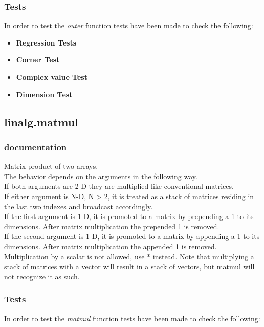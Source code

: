\documentclass[a4paper,11pt]{article}
\begin{document}
\subsubsection{Tests}

In order to test the \textit{outer} function tests have been made to check the following:

\begin{itemize}
	\item \textbf{Regression Tests}
	\item \textbf{Corner Test}
	\item \textbf{Complex value Test}
	\item \textbf{Dimension Test}
\end{itemize}

\subsection{linalg.matmul}
\subsubsection{documentation}
Matrix product of two arrays.\\

The behavior depends on the arguments in the following way.\\

If both arguments are 2-D they are multiplied like conventional matrices.\\
If either argument is N-D, N > 2, it is treated as a stack of matrices residing in the last two indexes and broadcast accordingly.\\
If the first argument is 1-D, it is promoted to a matrix by prepending a 1 to its dimensions. After matrix multiplication the prepended 1 is removed.\\
If the second argument is 1-D, it is promoted to a matrix by appending a 1 to its dimensions. After matrix multiplication the appended 1 is removed.\\
Multiplication by a scalar is not allowed, use * instead. Note that multiplying a stack of matrices with a vector will result in a stack of vectors, but matmul will not recognize it as such.\\

\subsubsection{Tests}
In order to test the \textit{matmul} function tests have been made to check the following:
\end{document}
